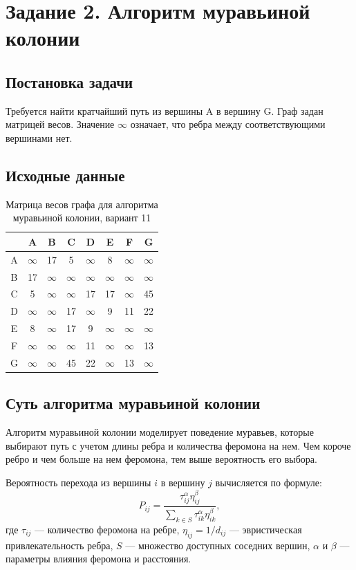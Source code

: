\documentclass[12pt,a4paper]{article}
\begin{document}
\section{Задание 2. Алгоритм муравьиной колонии}
\subsection{Постановка задачи}
Требуется найти кратчайший путь из вершины A в вершину G. Граф задан матрицей весов. Значение $\infty$ означает, что ребра между соответствующими вершинами нет.

\subsection{Исходные данные}
\begin{table}[h!]
\centering
\caption{Матрица весов графа для алгоритма муравьиной колонии, вариант 11}
\begin{tabular}{c|ccccccc}
\toprule
 & A & B & C & D & E & F & G \\
\midrule
A & $\infty$ & 17 & 5 & $\infty$ & 8 & $\infty$ & $\infty$ \\
B & 17 & $\infty$ & $\infty$ & $\infty$ & $\infty$ & $\infty$ & $\infty$ \\
C & 5 & $\infty$ & $\infty$ & 17 & 17 & $\infty$ & 45 \\
D & $\infty$ & $\infty$ & 17 & $\infty$ & 9 & 11 & 22 \\
E & 8 & $\infty$ & 17 & 9 & $\infty$ & $\infty$ & $\infty$ \\
F & $\infty$ & $\infty$ & $\infty$ & 11 & $\infty$ & $\infty$ & 13 \\
G & $\infty$ & $\infty$ & 45 & 22 & $\infty$ & 13 & $\infty$ \\
\bottomrule
\end{tabular}
\end{table}

\subsection{Суть алгоритма муравьиной колонии}
Алгоритм муравьиной колонии моделирует поведение муравьев, которые выбирают путь с учетом длины ребра и количества феромона на нем. Чем короче ребро и чем больше на нем феромона, тем выше вероятность его выбора.

Вероятность перехода из вершины $i$ в вершину $j$ вычисляется по формуле:
\[
P_{ij}=\frac{\tau_{ij}^{\alpha}\eta_{ij}^{\beta}}{\sum\limits_{k \in S}\tau_{ik}^{\alpha}\eta_{ik}^{\beta}},
\]
где $\tau_{ij}$ --- количество феромона на ребре, $\eta_{ij}=1/d_{ij}$ --- эвристическая привлекательность ребра, $S$ --- множество доступных соседних вершин, $\alpha$ и $\beta$ --- параметры влияния феромона и расстояния.
\end{document}
